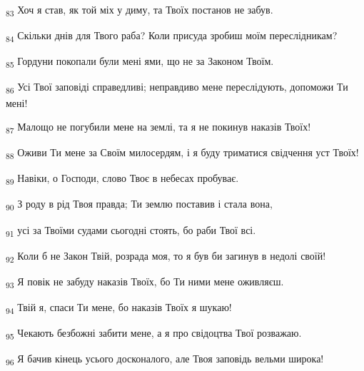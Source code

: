 \begin{tcolorbox}
\textsubscript{83} Хоч я став, як той міх у диму, та Твоїх постанов не забув.
\end{tcolorbox}
\begin{tcolorbox}
\textsubscript{84} Скільки днів для Твого раба? Коли присуда зробиш моїм переслідникам?
\end{tcolorbox}
\begin{tcolorbox}
\textsubscript{85} Гордуни покопали були мені ями, що не за Законом Твоїм.
\end{tcolorbox}
\begin{tcolorbox}
\textsubscript{86} Усі Твої заповіді справедливі; неправдиво мене переслідують, допоможи Ти мені!
\end{tcolorbox}
\begin{tcolorbox}
\textsubscript{87} Малощо не погубили мене на землі, та я не покинув наказів Твоїх!
\end{tcolorbox}
\begin{tcolorbox}
\textsubscript{88} Оживи Ти мене за Своїм милосердям, і я буду триматися свідчення уст Твоїх!
\end{tcolorbox}
\begin{tcolorbox}
\textsubscript{89} Навіки, о Господи, слово Твоє в небесах пробуває.
\end{tcolorbox}
\begin{tcolorbox}
\textsubscript{90} З роду в рід Твоя правда; Ти землю поставив і стала вона,
\end{tcolorbox}
\begin{tcolorbox}
\textsubscript{91} усі за Твоїми судами сьогодні стоять, бо раби Твої всі.
\end{tcolorbox}
\begin{tcolorbox}
\textsubscript{92} Коли б не Закон Твій, розрада моя, то я був би загинув в недолі своїй!
\end{tcolorbox}
\begin{tcolorbox}
\textsubscript{93} Я повік не забуду наказів Твоїх, бо Ти ними мене оживляєш.
\end{tcolorbox}
\begin{tcolorbox}
\textsubscript{94} Твій я, спаси Ти мене, бо наказів Твоїх я шукаю!
\end{tcolorbox}
\begin{tcolorbox}
\textsubscript{95} Чекають безбожні забити мене, а я про свідоцтва Твої розважаю.
\end{tcolorbox}
\begin{tcolorbox}
\textsubscript{96} Я бачив кінець усього досконалого, але Твоя заповідь вельми широка!
\end{tcolorbox}
